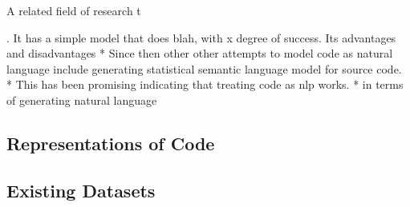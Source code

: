 




A related field of research t


. It has a simple model that does blah, with x degree of success. Its advantages and disadvantages
* Since then other other attempts to model code as natural language include generating statistical semantic language model for source code.
* This has been promising indicating that treating code as nlp works.
* in terms of generating natural language

\subsection{Representations of Code}

\subsection{Existing Datasets}


